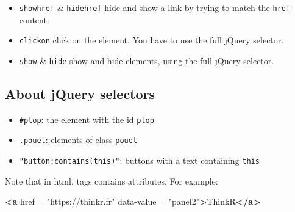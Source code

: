 \documentclass[]{book}
\newenvironment{Shaded}{\begin{snugshade}}{\end{snugshade}}
\newcommand{\KeywordTok}[1]{\textcolor[rgb]{0.13,0.29,0.53}{\textbf{#1}}}
\newcommand{\NormalTok}[1]{#1}
\newcommand{\OperatorTok}[1]{\textcolor[rgb]{0.81,0.36,0.00}{\textbf{#1}}}
\newcommand{\OtherTok}[1]{\textcolor[rgb]{0.56,0.35,0.01}{#1}}
\newcommand{\StringTok}[1]{\textcolor[rgb]{0.31,0.60,0.02}{#1}}
\providecommand{\tightlist}{%
  \setlength{\itemsep}{0pt}\setlength{\parskip}{0pt}}
\begin{document}
\begin{Shaded}
\end{Shaded}

\begin{itemize}
\tightlist
\item
  \texttt{showhref} \& \texttt{hidehref} hide and show a link by trying to match the \texttt{href} content.
\end{itemize}

\begin{Shaded}
\end{Shaded}

\begin{itemize}
\item
  \texttt{clickon} click on the element. You have to use the full jQuery selector.
\item
  \texttt{show} \& \texttt{hide} show and hide elements, using the full jQuery selector.
\end{itemize}

\hypertarget{about-jquery-selectors}{%
\subsection{About jQuery selectors}\label{about-jquery-selectors}}

\begin{itemize}
\item
  \texttt{\#plop}: the element with the id \texttt{plop}
\item
  \texttt{.pouet}: elements of class \texttt{pouet}
\item
  \texttt{"button:contains(\textquotesingle{}this\textquotesingle{})"}: buttons with a text containing \texttt{\textquotesingle{}this\textquotesingle{}}
\end{itemize}

Note that in html, tags contains attributes. For example:

\begin{Shaded}
\begin{Highlighting}[]
\KeywordTok{<a}\OtherTok{ href} \OtherTok{=} \StringTok{"https://thinkr.fr"}\OtherTok{ data-value} \OtherTok{=} \StringTok{"panel2"}\KeywordTok{>}\NormalTok{ThinkR}\KeywordTok{</a>}
\end{Highlighting}
\end{Shaded}
\end{document}
